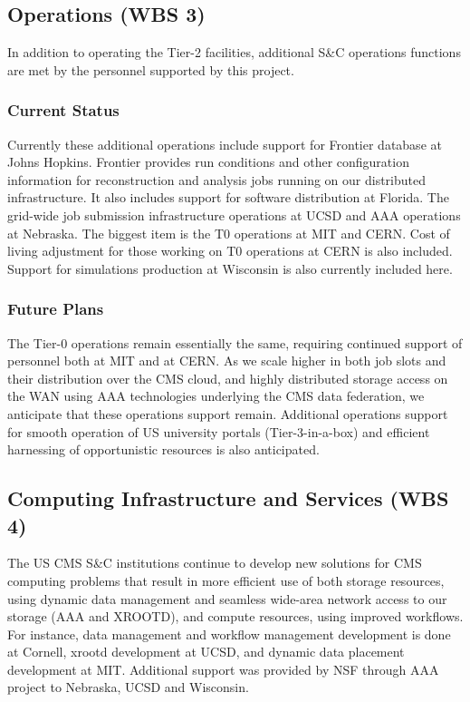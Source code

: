 \documentclass[11pt,a4paper]{article}
\begin{document}
\subsection{Operations (WBS 3)}

In addition to operating the Tier-2 facilities, additional S\&C 
operations functions are met by the personnel supported by this
project.  

\subsubsection{Current Status}

Currently these additional operations include support for Frontier
database at Johns Hopkins.  Frontier provides run conditions and other
configuration information for reconstruction and analysis jobs running
on our distributed infrastructure.  It also includes support for
software distribution at Florida.  The grid-wide job submission
infrastructure operations at UCSD and AAA operations at Nebraska. The
biggest item is the T0 operations at MIT and CERN.  Cost of living
adjustment for those working on T0 operations at CERN is also
included.  Support for simulations production at Wisconsin is also
currently included here.

\subsubsection{Future Plans}

The Tier-0 operations remain essentially the same, requiring continued
support of personnel both at MIT and at CERN.  As we scale higher in
both job slots and their distribution over the CMS cloud, and highly
distributed storage access on the WAN using AAA technologies
underlying the CMS data federation, we anticipate that these
operations support remain.  Additional operations support for smooth
operation of US university portals (Tier-3-in-a-box) and efficient
harnessing of opportunistic resources is also anticipated.

\subsection{Computing Infrastructure and Services (WBS 4)}

The US CMS S\&C institutions continue to develop new solutions for CMS
computing problems that result in more efficient use of both storage
resources, using dynamic data management and seamless wide-area
network access to our storage (AAA and XROOTD), and compute resources,
using improved workflows.  For instance, data management and workflow 
management development is done at Cornell, xrootd development at
UCSD, and dynamic data placement development at MIT.  Additional 
support was provided by NSF through AAA project to Nebraska, UCSD
and Wisconsin.
\end{document}
